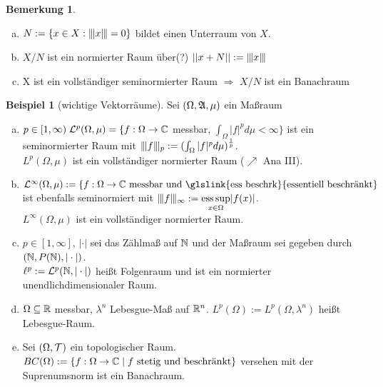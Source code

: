 \documentclass[ngerman]{report}
\theoremstyle{plain}%
\theoremstyle{definition}%
\newtheorem{bsp}[thm]{Beispiel}
\theoremstyle{myStyle}
\newtheorem{bem}[thm]{Bemerkung}
\begin{document}
\begin{bem}
	\begin{enumerate}[(a)]
		\item $N:=\{x\in X: \interleave{x}\interleave=0\}$ bildet einen Unterraum von $X$.
		\item $X/N$ ist ein normierter Raum über(?) $\left\lvert \left\lvert x+N \right\rvert \right\rvert := \interleave{x}\interleave$
		\item X ist ein vollständiger seminormierter Raum $\Rightarrow$ $X/N$ ist ein Banachraum 
	\end{enumerate}
\end{bem}

\begin{bsp}[wichtige Vektorräume]\label{wichtige Vektorräume}
	Sei $(\Omega,\mathfrak{A},\mu)$ ein Maßraum
		\begin{enumerate}[(a)]
			\item $p\in[1,\infty)\; \mathcal{L}^p(\Omega,\mu) = \{f:\Omega \rightarrow \mathbb{C}$ messbar, 
						$\int_\Omega |f|^p d\mu < \infty \}$ ist ein seminormierter Raum mit 
						$\interleave{f}\interleave_p := (\int_\Omega |f|^p d\mu )^{\frac{1}{p}}$.\\
						$L^p(\Omega,\mu)$ ist ein vollständiger normierter Raum ($\nearrow$ Ana III).

			\item $\hL^\infty(\Omega,\mu) := \{f:\Omega \rightarrow \C 
						\text{ messbar und \glslink{ess beschrk}{essentiell beschränkt} }$ ist ebenfalls seminormiert mit 
						$\interleave{f}\interleave_\infty := \underset{x\in\Omega}{\textnormal{ess} \sup} |f(x)|$.\\
						$L^\infty(\Omega,\mu)$ ist ein vollständiger normierter Raum.

			\item $p\in [1,\infty],\, |\cdot|$ sei das Zählmaß auf $\mathbb{N}$ und der Maßraum sei gegeben durch 
						$(\mathbb{N}, P(\mathbb{N}), |\cdot|)$.\\
						$\ell^p := \mathcal{L}^p(\mathbb{N}, |\cdot|)$ heißt Folgenraum und ist ein normierter unendlichdimensionaler Raum.

			\item $\Omega \subseteq \mathbb{R}$ messbar, $\lambda^n$ Lebesgue-Maß auf $\mathbb{R}^n$.
						$L^p(\Omega) := L^p(\Omega,\lambda^n)$ heißt Lebesgue-Raum.

			\item Sei $(\Omega, \mathcal{T})$ ein topologischer Raum. 
						$BC(\Omega) := \{ f: \Omega \rightarrow \mathbb{C}\;|\;f 
						\text{ stetig und beschränkt} \}$ versehen mit der Suprenumsnorm ist ein Banachraum.
	\end{enumerate}
\end{bsp}
\end{document}
